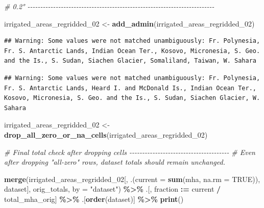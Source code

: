 \documentclass[
  11pt,
]{article}
\newenvironment{Shaded}{\begin{snugshade}}{\end{snugshade}}
\newcommand{\AttributeTok}[1]{\textcolor[rgb]{0.13,0.29,0.53}{#1}}
\newcommand{\CommentTok}[1]{\textcolor[rgb]{0.56,0.35,0.01}{\textit{#1}}}
\newcommand{\ConstantTok}[1]{\textcolor[rgb]{0.56,0.35,0.01}{#1}}
\newcommand{\FunctionTok}[1]{\textcolor[rgb]{0.13,0.29,0.53}{\textbf{#1}}}
\newcommand{\NormalTok}[1]{#1}
\newcommand{\OtherTok}[1]{\textcolor[rgb]{0.56,0.35,0.01}{#1}}
\newcommand{\SpecialCharTok}[1]{\textcolor[rgb]{0.81,0.36,0.00}{\textbf{#1}}}
\newcommand{\StringTok}[1]{\textcolor[rgb]{0.31,0.60,0.02}{#1}}
\begin{document}
\begin{Shaded}
\begin{Highlighting}[]
\CommentTok{\# 0.2° {-}{-}{-}{-}{-}{-}{-}{-}{-}{-}{-}{-}{-}{-}{-}{-}{-}{-}{-}{-}{-}{-}{-}{-}{-}{-}{-}{-}{-}{-}{-}{-}{-}{-}{-}{-}{-}{-}{-}{-}{-}{-}{-}{-}{-}{-}{-}{-}{-}{-}{-}{-}{-}{-}{-}{-}{-}{-}{-}{-}{-}{-}{-}{-}{-}{-}{-}{-}{-}{-}{-}{-}{-}}

\NormalTok{irrigated\_areas\_regridded\_02 }\OtherTok{\textless{}{-}} \FunctionTok{add\_admin}\NormalTok{(irrigated\_areas\_regridded\_02)}
\end{Highlighting}
\end{Shaded}

\begin{verbatim}
## Warning: Some values were not matched unambiguously: Fr. Polynesia, Fr. S. Antarctic Lands, Indian Ocean Ter., Kosovo, Micronesia, S. Geo. and the Is., S. Sudan, Siachen Glacier, Somaliland, Taiwan, W. Sahara
\end{verbatim}

\begin{verbatim}
## Warning: Some values were not matched unambiguously: Fr. Polynesia, Fr. S. Antarctic Lands, Heard I. and McDonald Is., Indian Ocean Ter., Kosovo, Micronesia, S. Geo. and the Is., S. Sudan, Siachen Glacier, W. Sahara
\end{verbatim}

\begin{Shaded}
\begin{Highlighting}[]
\NormalTok{irrigated\_areas\_regridded\_02 }\OtherTok{\textless{}{-}} \FunctionTok{drop\_all\_zero\_or\_na\_cells}\NormalTok{(irrigated\_areas\_regridded\_02)}

\CommentTok{\# Final total check after dropping cells {-}{-}{-}{-}{-}{-}{-}{-}{-}{-}{-}{-}{-}{-}{-}{-}{-}{-}{-}{-}{-}{-}{-}{-}{-}{-}{-}{-}{-}{-}{-}{-}{-}{-}{-}{-}{-}{-}{-}}
\CommentTok{\# Even after dropping "all{-}zero" rows, dataset totals should remain unchanged.}

\FunctionTok{merge}\NormalTok{(irrigated\_areas\_regridded\_02[, .(}\AttributeTok{current =} \FunctionTok{sum}\NormalTok{(mha, }\AttributeTok{na.rm =} \ConstantTok{TRUE}\NormalTok{)), dataset],}
\NormalTok{      orig\_totals, }\AttributeTok{by =} \StringTok{"dataset"}\NormalTok{) }\SpecialCharTok{\%\textgreater{}\%}
\NormalTok{  .[, fraction }\SpecialCharTok{:=}\NormalTok{ current }\SpecialCharTok{/}\NormalTok{ total\_mha\_orig] }\SpecialCharTok{\%\textgreater{}\%}
\NormalTok{  .[}\FunctionTok{order}\NormalTok{(dataset)] }\SpecialCharTok{\%\textgreater{}\%}
  \FunctionTok{print}\NormalTok{()}
\end{Highlighting}
\end{Shaded}
\end{document}
